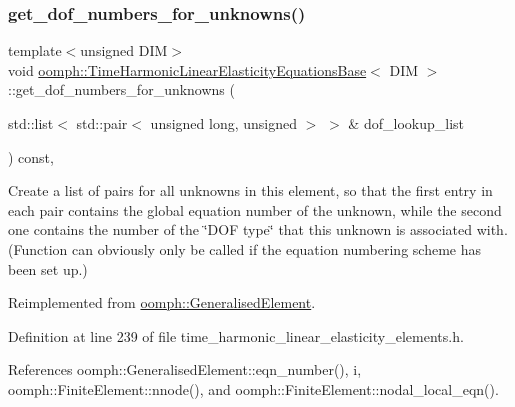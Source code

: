 \subsubsection{\texorpdfstring{get\+\_\+dof\+\_\+numbers\+\_\+for\+\_\+unknowns()}{get\_dof\_numbers\_for\_unknowns()}}
{\footnotesize\ttfamily template$<$unsigned D\+IM$>$ \\
void \hyperlink{classoomph_1_1TimeHarmonicLinearElasticityEquationsBase}{oomph\+::\+Time\+Harmonic\+Linear\+Elasticity\+Equations\+Base}$<$ D\+IM $>$\+::get\+\_\+dof\+\_\+numbers\+\_\+for\+\_\+unknowns (\begin{DoxyParamCaption}\item[{std\+::list$<$ std\+::pair$<$ unsigned long, unsigned $>$ $>$ \&}]{dof\+\_\+lookup\+\_\+list }\end{DoxyParamCaption}) const\hspace{0.3cm}{\ttfamily [inline]}, {\ttfamily [virtual]}}



Create a list of pairs for all unknowns in this element, so that the first entry in each pair contains the global equation number of the unknown, while the second one contains the number of the \char`\"{}\+D\+O\+F type\char`\"{} that this unknown is associated with. (Function can obviously only be called if the equation numbering scheme has been set up.) 



Reimplemented from \hyperlink{classoomph_1_1GeneralisedElement_a069f59bfc3e607a5bebba52c6314d777}{oomph\+::\+Generalised\+Element}.



Definition at line 239 of file time\+\_\+harmonic\+\_\+linear\+\_\+elasticity\+\_\+elements.\+h.



References oomph\+::\+Generalised\+Element\+::eqn\+\_\+number(), i, oomph\+::\+Finite\+Element\+::nnode(), and oomph\+::\+Finite\+Element\+::nodal\+\_\+local\+\_\+eqn().

\mbox{\label{classoomph_1_1TimeHarmonicLinearElasticityEquationsBase_af64915acc72c5216fb3522825d93a048}} 
